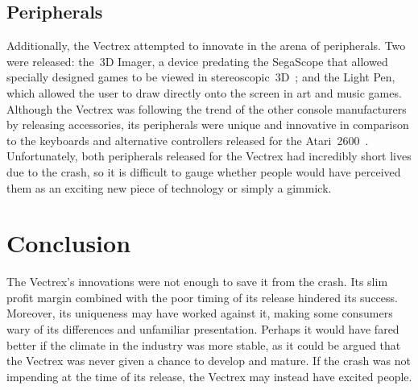 \documentclass{scrartcl}
\begin{document}
\subsection*{Peripherals} 
Additionally, the Vectrex attempted to innovate in the arena of peripherals. Two were released: the~3D Imager, a device predating the SegaScope that allowed specially designed games to be viewed in stereoscopic~3D~\cite{zachara:stereo}; and the Light Pen, which allowed the user to draw directly onto the screen in art and music games. Although the Vectrex was following the trend of the other console manufacturers by releasing accessories, its peripherals were unique and innovative in comparison to the keyboards and alternative controllers released for the Atari~2600~\cite[pp. 24, 62]{montfort:beam}. Unfortunately, both peripherals released for the Vectrex had incredibly short lives due to the crash, so it is difficult to gauge whether people would have perceived them as an exciting new piece of technology or simply a gimmick.




\section*{Conclusion}
The Vectrex's innovations were not enough to save it from the crash. Its slim profit margin combined with the poor timing of its release hindered its success. Moreover, its uniqueness may have worked against it, making some consumers wary of its differences and unfamiliar presentation. Perhaps it would have fared better if the climate in the industry was more stable, as it could be argued that the Vectrex was never given a chance to develop and mature. If the crash was not impending at the time of its release, the Vectrex may instead have excited people.




\end{document}
